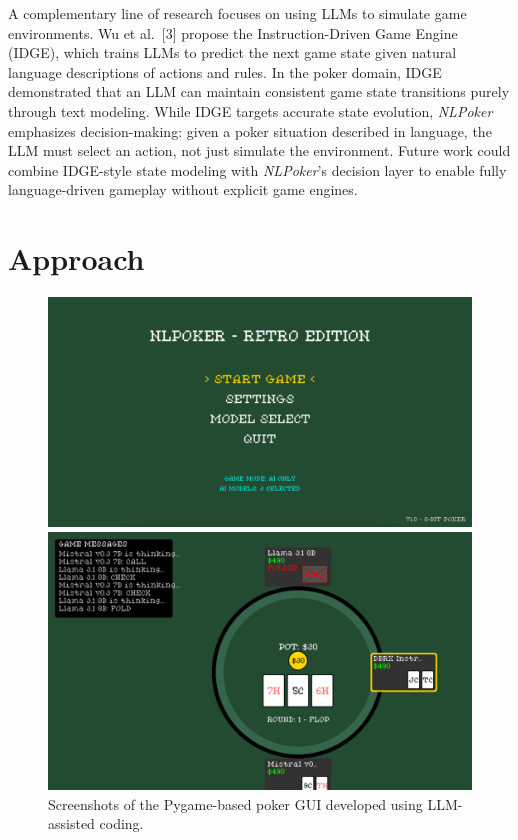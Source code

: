 \documentclass{article}
\begin{document}
A complementary line of research focuses on using LLMs to simulate game environments. Wu et al.\ [3] propose the Instruction-Driven Game Engine (IDGE), which trains LLMs to predict the next game state given natural language descriptions of actions and rules. In the poker domain, IDGE demonstrated that an LLM can maintain consistent game state transitions purely through text modeling. While IDGE targets accurate state evolution, \emph{NLPoker} emphasizes decision-making: given a poker situation described in language, the LLM must select an action, not just simulate the environment. Future work could combine IDGE-style state modeling with \emph{NLPoker}’s decision layer to enable fully language-driven gameplay without explicit game engines.

\section{Approach}
\begin{figure}[htbp]
\centering
\begin{minipage}{0.48\textwidth}
\includegraphics[width=\linewidth]{ss1.png}
\end{minipage}\hfill
\begin{minipage}{0.48\textwidth}
\includegraphics[width=\linewidth]{ss2.png}
\end{minipage}
\caption{Screenshots of the Pygame-based poker GUI developed using LLM-assisted coding.}
\end{figure}
\end{document}
